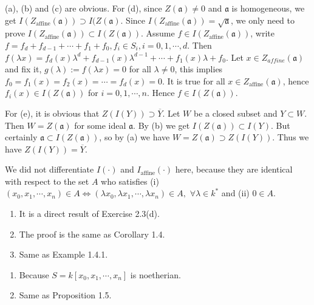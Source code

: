 \begin{solution}
  (a), (b) and (c) are obvious. For (d), since $Z(\mathfrak{a})\neq 0$ and $\mathfrak{a}$ is homogeneous, we get $I(Z_{\mathrm{affine}}\left( \mathfrak{a} \right) )\supset I(Z\left( \mathfrak{a} \right) $. Since $I\left( Z_{\mathrm{affine}}(\mathfrak{a}) \right)= \sqrt{\mathfrak{a}}$, we only need to prove $I\left( Z_{\mathrm{affine}}(\mathfrak{a}) \right)\subset I\left( Z(\mathfrak{a}) \right)  $. Assume $f\in I\left( Z_{\mathrm{affine}}(\mathfrak{a}) \right) $,
  write $f=f_d+f_{d-1}+\cdots +f_1+f_0, f_i \in S_i,i=0,1,\cdots,d$. Then 
  $f(\lambda x)=f_d(x)\lambda^{d}+f_{d-1}(x)\lambda^{d-1}+\cdots+f_1(x)\lambda+f_0$. Let $x \in Z_{affine}(\mathfrak{a})$ and fix it, $g(\lambda):=f(\lambda x)=0$ for all $\lambda\neq 0$, this implies $f_0=f_1(x)=f_2(x)=\cdots=f_d(x)=0$. It is true for all $x\in Z_{\mathrm{affine}}(\mathfrak{a})$, hence $f_i(x) \in I(Z(\mathfrak{a}))$ for $i=0,1,\cdots,n$. Hence $f \in I(Z(\mathfrak{a}))$.

  For (e), it is obvious that $Z\left( I(Y) \right) \supset \overline{Y}$. Let $W$ be a closed subset and  $Y\subset W$. Then $W=Z(\mathfrak{a})$ for some ideal $\mathfrak{a}$. By (b) we get $I\left( Z(\mathfrak{a}) \right)\subset I(Y) $. But certainly $\mathfrak{a}\subset I\left( Z\left( \mathfrak{a} \right)  \right) $, so by (a) we have $W=Z\left( \mathfrak{a} \right) \supset Z\left( I\left( Y \right)  \right) $.  Thus we have $Z\left( I\left( Y \right)  \right) = \overline{Y}$. 
\end{solution}
\begin{remark}
  We did not differentiate $I(\cdot )$ and $I_{\mathrm{affine}}(\cdot )$ here, because they are identical with respect to the set $A$ who satisfies (i) $(x_0,x_1,\cdots,x_n) \in A\Leftrightarrow (\lambda x_0,\lambda x_1,\cdots,\lambda x_n) \in A,$ $ \forall \lambda \in k^{*} $ and (ii) $0\in A$.
\end{remark}
\begin{solution}
  \begin{enumerate}
    \item It is a direct result of Exercise 2.3(d).
    \item The proof is the same as Corollary 1.4.
    \item Same as Example 1.4.1.
  \end{enumerate}
\end{solution}
\begin{solution}
  \begin{enumerate}
    \item Because $S=k[x_0,x_1,\cdots,x_n]$ is noetherian.
    \item Same as Proposition 1.5.
  \end{enumerate}
\end{solution}
